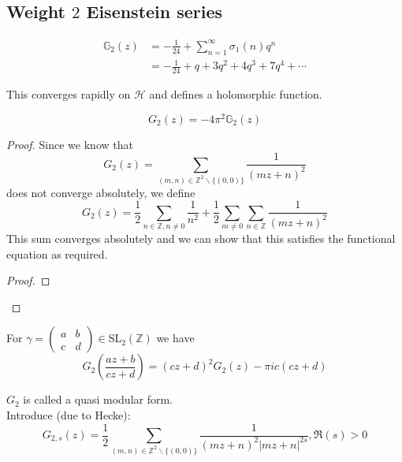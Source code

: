 \documentclass[oneside, 12pt]{scrbook}
\newcommand{\ZZ}{\mathbb Z}
\newcommand{\Hh}{\mathcal{H}}
\theoremstyle{theorem}
\begin{document}
\subsection{Weight $2$ Eisenstein series}

\begin{definition}
\begin{align*}
\mathbb{G}_{2}(z) &= -\frac{1}{24} + \sum_{n=1}^{\infty} \sigma_{1}(n)q^n \\
&= -\frac{1}{24} + q + 3q^2 + 4q^3 + 7q^4 + \cdots 
\end{align*} 
\end{definition}

This converges rapidly on $\Hh$ and defines a holomorphic function. 

\begin{proposition}
$$G_{2}(z) = - 4 \pi^2 \mathbb{G}_{2}(z)$$
\end{proposition}

\begin{proof}
Since we know that $$G_{2}(z) = \sum_{(m,n) \in \ZZ^2 \backslash \{(0,0)\}}\frac{1}{(mz+n)^2}$$ does not converge absolutely, we define $$G_{2}(z) = \frac{1}{2} \sum_{n \in \ZZ , n \neq 0} \frac{1}{n^2} + \frac{1}{2} \sum_{m \neq 0} \sum_{n \in \ZZ} \frac{1}{(mz+n)^2}$$
This sum converges absolutely and we can show that this satisfies the functional equation as required.
\begin{lemma}

\end{lemma}

\begin{proof}

\end{proof}

\end{proof}

\begin{proposition}
For $\gamma = \begin{pmatrix}
a & b \\ c & d 
\end{pmatrix} \in \mathrm{SL}_{2}(\ZZ)$ we have $$G_{2}\left( \frac{az+b}{cz+d} \right) = (cz+d)^2 G_{2}(z) - \pi i c(cz+d)$$
\end{proposition}

$G_{2}$ is called a quasi modular form. \\

Introduce (due to Hecke): $$G_{2,s}(z) = \frac{1}{2} \sum_{(m,n)\in \ZZ^2 \backslash \{(0,0)\}} \frac{1}{(mz+n)^2 |mz+n|^{2s}} , \mathfrak{R}(s) >0$$
\end{document}
